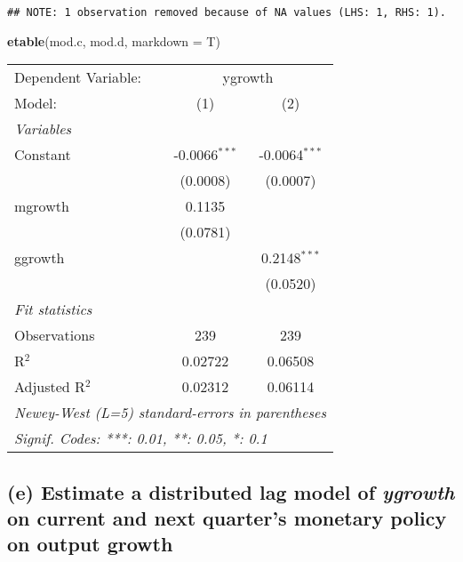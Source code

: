 \documentclass[
]{article}
\newenvironment{Shaded}{\begin{snugshade}}{\end{snugshade}}
\newcommand{\AttributeTok}[1]{\textcolor[rgb]{0.13,0.29,0.53}{#1}}
\newcommand{\FunctionTok}[1]{\textcolor[rgb]{0.13,0.29,0.53}{\textbf{#1}}}
\newcommand{\NormalTok}[1]{#1}
\begin{document}
\begin{verbatim}
## NOTE: 1 observation removed because of NA values (LHS: 1, RHS: 1).
\end{verbatim}

\begin{Shaded}
\begin{Highlighting}[]
\FunctionTok{etable}\NormalTok{(mod.c, mod.d, }\AttributeTok{markdown =}\NormalTok{ T)}
\end{Highlighting}
\end{Shaded}

\begingroup
\centering
\begin{tabular}{lcc}
   \tabularnewline \midrule \midrule
   Dependent Variable: & \multicolumn{2}{c}{ygrowth}\\
   Model:         & (1)             & (2)\\  
   \midrule
   \emph{Variables}\\
   Constant       & -0.0066$^{***}$ & -0.0064$^{***}$\\   
                  & (0.0008)        & (0.0007)\\   
   mgrowth        & 0.1135          &   \\   
                  & (0.0781)        &   \\   
   ggrowth        &                 & 0.2148$^{***}$\\   
                  &                 & (0.0520)\\   
   \midrule
   \emph{Fit statistics}\\
   Observations   & 239             & 239\\  
   R$^2$          & 0.02722         & 0.06508\\  
   Adjusted R$^2$ & 0.02312         & 0.06114\\  
   \midrule \midrule
   \multicolumn{3}{l}{\emph{Newey-West (L=5) standard-errors in parentheses}}\\
   \multicolumn{3}{l}{\emph{Signif. Codes: ***: 0.01, **: 0.05, *: 0.1}}\\
\end{tabular}
\par\endgroup

\hypertarget{e-estimate-a-distributed-lag-model-of-ygrowth-on-current-and-next-quarters-monetary-policy-on-output-growth}{%
\subsection{\texorpdfstring{(e) Estimate a distributed lag model of
\emph{ygrowth} on current and next quarter's monetary policy on output
growth}{(e) Estimate a distributed lag model of ygrowth on current and next quarter's monetary policy on output growth}}\label{e-estimate-a-distributed-lag-model-of-ygrowth-on-current-and-next-quarters-monetary-policy-on-output-growth}}
\end{document}
